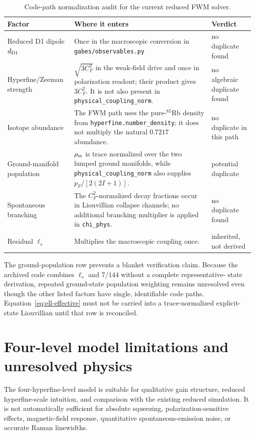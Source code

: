 \documentclass[11pt,a4paper]{article}
\begin{document}
\begin{table}[ht]
\centering
\caption{Code-path normalization audit for the current reduced FWM solver.}
\label{tab:normalization-audit}
\small
\begin{tabularx}{\textwidth}{L{3.2cm}Y L{2.5cm}}
\toprule
Factor & Where it enters & Verdict\\
\midrule
Reduced D1 dipole $d_{\rm D1}$ &
Once in the macroscopic conversion in
\texttt{gabes/observables.py} & no duplicate found\\
Hyperfine/Zeeman strength &
$\sqrt{3C_F^2}$ in the weak-field drive and once in polarization readout;
their product gives $3C_F^2$. It is not also present in
\texttt{physical\_coupling\_norm}. & no algebraic duplicate found\\
Isotope abundance &
The FWM path uses the pure-$^{85}$Rb density from
\texttt{hyperfine.number\_density}; it does not multiply the natural
$0.7217$ abundance. & no duplicate in this path\\
Ground-manifold population &
$\rho_{\rm ss}$ is trace normalized over the two lumped ground manifolds,
while \texttt{physical\_coupling\_norm} also supplies
$p_F/[2(2I+1)]$. & \textcolor{amber}{potential duplicate}\\
Spontaneous branching &
The $C_F^2$-normalized decay fractions occur in Liouvillian collapse
channels; no additional branching multiplier is applied in
\texttt{chi\_phys}. & no duplicate found\\
Residual $\ell_s$ &
Multiplies the macroscopic coupling once. & inherited, not derived\\
\bottomrule
\end{tabularx}
\end{table}

The ground-population row prevents a blanket verification claim. Because the
archived code combines $\ell_s$ and $7/144$ without a complete representative-
state derivation, repeated ground-state population weighting remains
unresolved even though the other listed factors have single, identifiable
code paths. Equation~\eqref{eq:ell-effective} must not be carried into a
trace-normalized explicit-state Liouvillian until that row is reconciled.

\section{Four-level model limitations and unresolved physics}
\label{app:limitations}

The four-hyperfine-level model is suitable for qualitative gain structure,
reduced hyperfine-scale intuition, and comparison with the existing reduced
simulation. It is not automatically sufficient for absolute squeezing,
polarization-sensitive effects, magnetic-field response, quantitative
spontaneous-emission noise, or accurate Raman linewidths.
\end{document}
